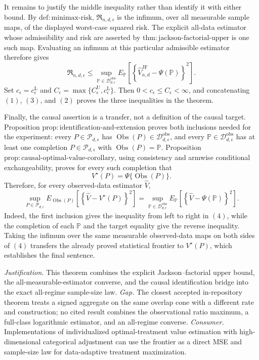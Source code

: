 \documentclass{article}
\begin{document}
It remains to justify the middle inequality rather than identify it with either bound.  By \(\mathrm{def:minimax\mbox{-}risk}\), \(\mathfrak R_{n,d,\epsilon}\) is the infimum, over all measurable sample maps, of the displayed worst-case squared risk.  The explicit all-data estimator whose admissibility and risk are asserted by \(\mathrm{thm:jackson\mbox{-}factorial\mbox{-}upper}\) is one such map.  Evaluating an infimum at this particular admissible estimator therefore gives
\[
 \mathfrak R_{n,d,\epsilon}
 \leq
 \sup_{\mathbb P\in\mathcal D_{d,\epsilon}^{\mathrm{obs}}}
 E_{\mathbb P}\!\left[
 \left\{\widehat V_{n,d}^{\mathrm{JF}}-\Psi(\mathbb P)\right\}^{2}
 \right].                                                                            \tag{3}
\]
Set \(c_\epsilon=c_{\epsilon}^{\mathrm L}\) and \(C_\epsilon=\max\{C_{\epsilon}^{\mathrm U},c_{\epsilon}^{\mathrm L}\}\).  Then \(0<c_\epsilon\leq C_\epsilon<\infty\), and concatenating \((1)\), \((3)\), and \((2)\) proves the three inequalities in the theorem.

Finally, the causal assertion is a transfer, not a definition of the causal target.  Proposition \(\mathrm{prop:identification\mbox{-}and\mbox{-}extension}\) proves both inclusions needed for the experiment: every \(P\in\mathcal P_{d,\epsilon}\) has \(\operatorname{Obs}(P)\in\mathcal D_{d,\epsilon}^{\mathrm{obs}}\), and every \(\mathbb P\in\mathcal D_{d,\epsilon}^{\mathrm{obs}}\) has at least one completion \(P\in\mathcal P_{d,\epsilon}\) with \(\operatorname{Obs}(P)=\mathbb P\).  Proposition \(\mathrm{prop:causal\mbox{-}optimal\mbox{-}value\mbox{-}corollary}\), using consistency and armwise conditional exchangeability, proves for every such completion that
\[
 V^\star(P)=\Psi\{\operatorname{Obs}(P)\}.
\]
Therefore, for every observed-data estimator \(\widehat V\),
\[
 \sup_{P\in\mathcal P_{d,\epsilon}}
 E_{\operatorname{Obs}(P)}\!\left[
 \left\{\widehat V-V^\star(P)\right\}^{2}
 \right]
 =
 \sup_{\mathbb P\in\mathcal D_{d,\epsilon}^{\mathrm{obs}}}
 E_{\mathbb P}\!\left[
 \left\{\widehat V-\Psi(\mathbb P)\right\}^{2}
 \right].                                                                             \tag{4}
\]
Indeed, the first inclusion gives the inequality from left to right in \((4)\), while the completion of each \(\mathbb P\) and the target equality give the reverse inequality.  Taking the infimum over the same measurable observed-data maps on both sides of \((4)\) transfers the already proved statistical frontier to \(V^\star(P)\), which establishes the final sentence.
\par\smallskip\noindent \textit{Justification.} This theorem combines the explicit Jackson--factorial upper bound, the all-measurable-estimator converse, and the causal identification bridge into the exact all-regime sample-size law. \textit{Gap.} The closest accepted in-repository theorem treats a signed aggregate on the same overlap cone with a different rate and construction; no cited result combines the observational ratio maximum, a full-class logarithmic estimator, and an all-regime converse. \textit{Consumer.} Implementations of individualized optimal-treatment value estimation with high-dimensional categorical adjustment can use the frontier as a direct MSE and sample-size law for data-adaptive treatment maximization.
\end{document}
